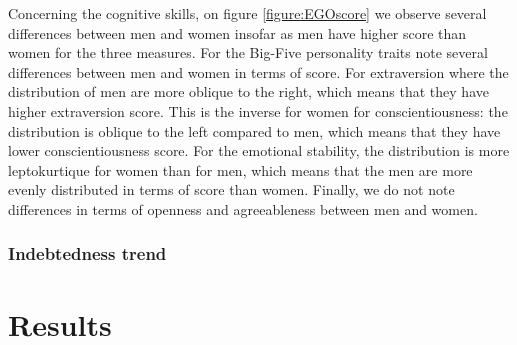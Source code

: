 \documentclass[a4paper, 11pt, onecolumn]{article}
\begin{document}
Concerning the cognitive skills, on figure \ref{figure:EGOscore} we observe several differences between men and women insofar as men have higher score than women for the three measures.
 For the Big-Five personality traits note several differences between men and women in terms of score.
For extraversion where the distribution of men are more oblique to the right, which means that they have higher extraversion score.
This is the inverse for women for conscientiousness: the distribution is oblique to the left compared to men, which means that they have lower conscientiousness score.
For the emotional stability, the distribution is more leptokurtique for women than for men, which means that the men are more evenly distributed in terms of score than women.
Finally, we do not note differences in terms of openness and agreeableness between men and women.

		\subsubsection{Indebtedness trend}






\newpage
\section{Results}

\end{document}

